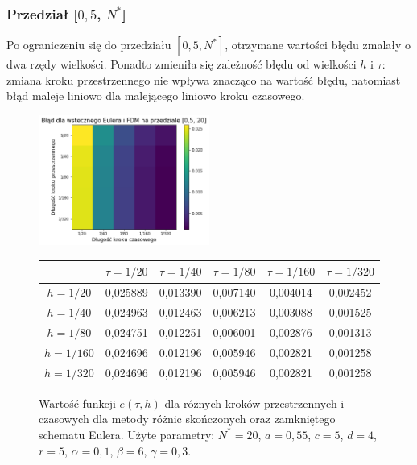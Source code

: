 \documentclass{article}
\begin{document}
		\subsubsection{Przedział [$0,5$, $N^{*}$]}
		Po ograniczeniu się do przedziału $[0,5, N^{*}]$, otrzymane wartości błędu zmalały o dwa rzędy wielkości. Ponadto zmieniła się zależność błędu od wielkości $h$ i $\tau$: zmiana kroku przestrzennego nie wpływa znacząco na wartość błędu, natomiast błąd maleje liniowo dla malejącego liniowo kroku czasowego.
		\begin{figure}[h!]
			\caption{Wartość funkcji $\bar{e}(\tau,h)$ dla różnych kroków przestrzennych i czasowych dla metody różnic skończonych oraz zamkniętego schematu Eulera. Użyte parametry: $N^{*}=20$, $a=0,55$, $c=5$, $d=4$, $r=5$, $\alpha=0,1$, $\beta=6$, $\gamma=0,3$. }
			\centering
			\includegraphics[width=0.5\textwidth]{images/blad_fdm_euler_krotki.pdf}
			\begin{tabular}{|c|c|c|c|c|c|}
				\hline
				&    $\tau=1/20$ &    $\tau=1/40$ &    $\tau=1/80$ &   $\tau=1/160$ &   $\tau=1/320$ \\
				\hline 
				$h=1/20$  &  0,025889 &	0,013390 &	0,007140 &	0,004014 &	0,002452 \\
				\hline
				$h=1/40$  &  0,024963 &	0,012463 &	0,006213 &	0,003088 &	0,001525 \\
				\hline
				$h=1/80$  &  0,024751 &	0,012251 &	0,006001 &	0,002876 &	0,001313 \\
				\hline
				$h=1/160$ &  0,024696 &	0,012196 &	0,005946 &	0,002821 &	0,001258 \\
				\hline
				$h=1/320$ &  0,024696 &	0,012196 &	0,005946 &	0,002821 &	0,001258 \\
				\hline
			\end{tabular}
		\end{figure}
\end{document}
